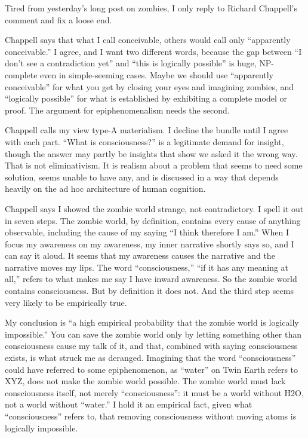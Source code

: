 
Tired from yesterday's long post on zombies, I only reply to Richard Chappell's comment and fix a loose end.

Chappell says that what I call conceivable, others would call only ``apparently conceivable.'' I agree, and I want two different words, because the gap between ``I don't see a contradiction yet'' and ``this is logically possible'' is huge, NP-complete even in simple-seeming cases. Maybe we should use ``apparently conceivable'' for what you get by closing your eyes and imagining zombies, and ``logically possible'' for what is established by exhibiting a complete model or proof. The argument for epiphenomenalism needs the second. 

Chappell calls my view type-A materialism. I decline the bundle until I agree with each part. ``What is consciousness?'' is a legitimate demand for insight, though the answer may partly be insights that show we asked it the wrong way. That is not eliminativism. It is realism about a problem that seems to need some solution, seems unable to have any, and is discussed in a way that depends heavily on the ad hoc architecture of human cognition.

Chappell says I showed the zombie world strange, not contradictory. I spell it out in seven steps. The zombie world, by definition, contains every cause of anything observable, including the cause of my saying ``I think therefore I am.'' When I focus my awareness on my awareness, my inner narrative shortly says so, and I can say it aloud. It seems that my awareness causes the narrative and the narrative moves my lips. The word ``consciousness,'' ``if it has any meaning at all,'' refers to what makes me say I have inward awareness. So the zombie world contains consciousness. But by definition it does not. And the third step seems very likely to be empirically true.

My conclusion is ``a high empirical probability that the zombie world is logically impossible.'' You can save the zombie world only by letting something other than consciousness cause my talk of it, and that, combined with saying consciousness exists, is what struck me as deranged. Imagining that the word ``consciousness'' could have referred to some epiphenomenon, as ``water'' on Twin Earth refers to XYZ, does not make the zombie world possible. The zombie world must lack consciousness itself, not merely ``consciousness'': it must be a world without H2O, not a world without ``water.'' I hold it an empirical fact, given what ``consciousness'' refers to, that removing consciousness without moving atoms is logically impossible. 

